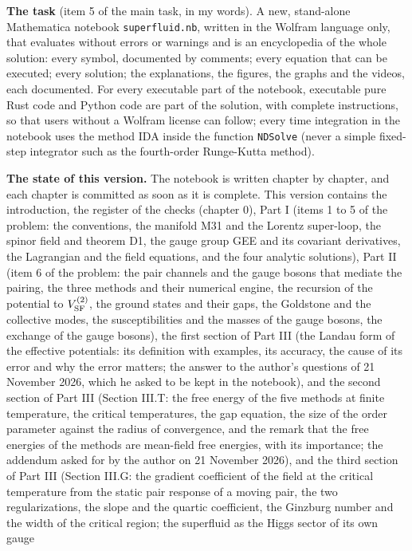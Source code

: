 \documentclass[
  10pt,
]{article}
\begin{document}
\textbf{The task} (item 5 of the main task, in my words). A new,
stand-alone Mathematica notebook \texttt{superfluid.nb}, written in the
Wolfram language only, that evaluates without errors or warnings and is
an encyclopedia of the whole solution: every symbol, documented by
comments; every equation that can be executed; every solution; the
explanations, the figures, the graphs and the videos, each documented.
For every executable part of the notebook, executable pure Rust code and
Python code are part of the solution, with complete instructions, so
that users without a Wolfram license can follow; every time integration
in the notebook uses the method IDA inside the function \texttt{NDSolve}
(never a simple fixed-step integrator such as the fourth-order
Runge-Kutta method).

\textbf{The state of this version.} The notebook is written chapter by
chapter, and each chapter is committed as soon as it is complete. This
version contains the introduction, the register of the checks (chapter
0), Part I (items 1 to 5 of the problem: the conventions, the manifold
M31 and the Lorentz super-loop, the spinor field and theorem D1, the
gauge group GEE and its covariant derivatives, the Lagrangian and the
field equations, and the four analytic solutions), Part II (item 6 of
the problem: the pair channels and the gauge bosons that mediate the
pairing, the three methods and their numerical engine, the recursion of
the potential to \(V^{(2)}_{\rm SF}\), the ground states and their gaps,
the Goldstone and the collective modes, the susceptibilities and the
masses of the gauge bosons, the exchange of the gauge bosons), the first
section of Part III (the Landau form of the effective potentials: its
definition with examples, its accuracy, the cause of its error and why
the error matters; the answer to the author's questions of 21 November
2026, which he asked to be kept in the notebook), and the second section
of Part III (Section III.T: the free energy of the five methods at
finite temperature, the critical temperatures, the gap equation, the
size of the order parameter against the radius of convergence, and the
remark that the free energies of the methods are mean-field free
energies, with its importance; the addendum asked for by the author on
21 November 2026), and the third section of Part III (Section III.G: the
gradient coefficient of the field at the critical temperature from the
static pair response of a moving pair, the two regularizations, the
slope and the quartic coefficient, the Ginzburg number and the width of
the critical region; the superfluid as the Higgs sector of its own gauge
\end{document}

